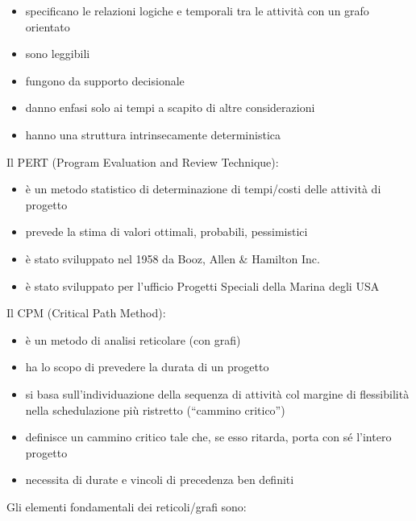 \documentclass[answers, a4paper, 11pt]{exam}
\begin{document}
\begin{itemize}
    \item specificano le relazioni logiche e temporali tra le attività con un grafo orientato
    \item sono leggibili
    \item fungono da supporto decisionale
    \item danno enfasi solo ai tempi a scapito di altre considerazioni
    \item hanno una struttura intrinsecamente deterministica
\end{itemize}

Il PERT (Program Evaluation and Review Technique):

\begin{itemize}
    \item è un metodo statistico di determinazione di tempi/costi delle attività di progetto
    \item prevede la stima di valori ottimali, probabili, pessimistici
    \item è stato sviluppato nel 1958 da Booz, Allen & Hamilton Inc.
    \item è stato sviluppato per l'ufficio Progetti Speciali della Marina degli USA
\end{itemize}

Il CPM (Critical Path Method):

\begin{itemize}
    \item è un metodo di analisi reticolare (con grafi)
    \item ha lo scopo di prevedere la durata di un progetto
    \item si basa sull'individuazione della sequenza di attività col margine di flessibilità nella schedulazione più ristretto (``cammino critico'')
    \item definisce un cammino critico tale che, se esso ritarda, porta con sé l'intero progetto
    \item necessita di durate e vincoli di precedenza ben definiti
\end{itemize}

Gli elementi fondamentali dei reticoli/grafi sono:
\end{document}
